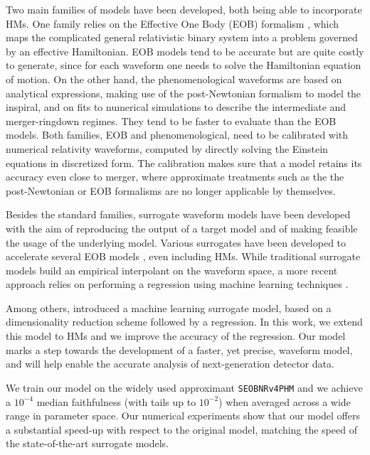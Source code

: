 \documentclass[twocolumn,showpacs,preprintnumbers,nofootinbib,prd,
superscriptaddress,10pt]{revtex4-1}
\begin{document}
Two main families of models have been developed, both being able to incorporate HMs.
One family relies on the Effective One Body (EOB) formalism 
\cite{Buonanno:2000ef, Damour:2009kr,Nagar:2020pcj,Chiaramello:2020ehz,Ossokine:2020kjp, Ramos-Buades:2023ehm, Nagar:2021gss}, 
which maps the complicated general relativistic binary system into a problem governed by an effective Hamiltonian. 
EOB models tend to be accurate but are quite costly to generate, since for each waveform one needs to solve the 
Hamiltonian equation of motion.
On the other hand, the phenomenological waveforms \cite{Khan:2015jqa,Pratten:2020ceb,Estelles:2020osj} are based on 
analytical expressions, making use of the post-Newtonian formalism to model the inspiral, and on fits to numerical
simulations to describe the intermediate and merger-ringdown regimes. They tend to be faster to evaluate than the EOB models.
Both families, EOB and phenomenological, need to be calibrated with numerical relativity waveforms, 
computed by directly solving the Einstein equations in discretized form. The calibration makes sure that a model 
retains its accuracy even close to merger, where approximate treatments such as the the post-Newtonian or EOB formalisms 
are no longer applicable by themselves.

Besides the standard families, surrogate waveform models have been developed with the aim of reproducing the 
output of a target model and of making feasible the usage of the underlying model. Various surrogates have been developed 
to accelerate several EOB models \cite{Gadre:2022sed}, even including HMs. While traditional surrogate 
models \cite{Varma:2018mmi,Williams:2019vub,Varma:2019csw,Rifat:2019ltp,Khan:2020fso, Gadre:2022sed} 
build an empirical interpolant on the waveform space, a more recent approach relies on performing a regression 
using machine learning techniques \cite{Chua:2018woh, Khan:2020fso, Thomas:2022rmc, Tissino:2022thn}.

Among others, \cite{Schmidt:2020yuu} introduced a machine learning surrogate model, based on a dimensionality 
reduction scheme followed by a regression. In this work, we extend this model to HMs and we improve the accuracy 
of the regression. Our model marks a step towards the development of a faster, yet precise, waveform model, and will 
help enable the accurate analysis of next-generation detector data.

We train our model on the widely used approximant \texttt{SEOBNRv4PHM} \cite{Ossokine:2020kjp} and we achieve a 
$10^{-4}$ median faithfulness (with tails up to $10^{-2}$) when averaged across a wide range in parameter space.
Our numerical experiments show that our model offers a substantial speed-up with respect to the original model, matching 
the speed of the state-of-the-art surrogate models.
\end{document}
